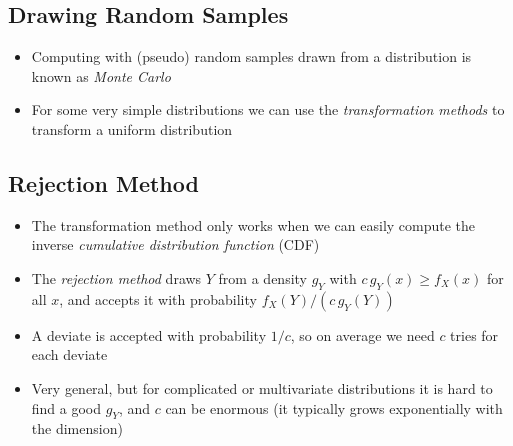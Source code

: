 
\begin{slide}
\section[-2]{Drawing Random Samples}

\pb
\begin{itemize}
\item Computing with (pseudo) random samples drawn from a
  distribution is known as \emph{Monte Carlo}\pauseh
\item For some very simple distributions we can use the \emph{transformation
  methods} to transform a uniform distribution\pauseh
\end{itemize}
\begin{center}
  \pause
\end{center}

\end{slide}


\begin{slide}
\section[-1]{Rejection Method}

\begin{PauseHighLight}
  \begin{itemize}
  \item The transformation method only works when we can easily compute
    the inverse \textit{cumulative distribution function} (CDF)\pause
  \item The \emph{rejection method} draws $Y$ from a density $g_Y$ with
    $c\,g_Y(x)\geq f_X(x)$ for all $x$, and accepts it with probability
    $f_X(Y)/(c\,g_Y(Y))$\pause
  \item A deviate is accepted with probability $1/c$, so on average
    we need $c$ tries for each deviate\pause
  \item Very general, but for complicated or multivariate distributions
    it is hard to find a good $g_Y$\pause, and $c$ can be enormous (it
    typically grows exponentially with the dimension)\pauseb
  \end{itemize}
\end{PauseHighLight}

\end{slide}

